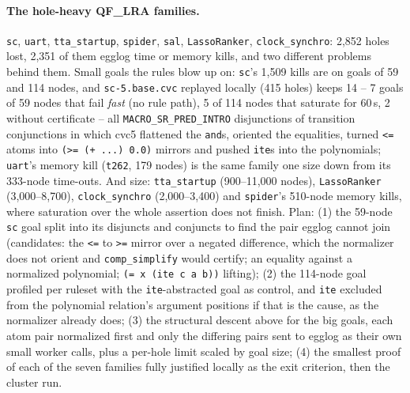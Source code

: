 \documentclass[11pt,a4paper]{article}
\newcommand{\LRA}{QF\_LRA}
\newcommand{\code}[1]{\texttt{#1}}
\begin{document}
\paragraph{The hole-heavy \LRA{} families.} \code{sc}, \code{uart},
\code{tta\_startup}, \code{spider}, \code{sal}, \code{LassoRanker},
\code{clock\_synchro}: 2,852 holes lost, 2,351 of them egglog time or
memory kills, and two different problems behind them. Small goals the
rules blow up on: \code{sc}'s 1,509 kills are on goals of 59 and 114
nodes, and \code{sc-5.base.cvc} replayed locally (415 holes) keeps 14 --
7 goals of 59 nodes that fail \emph{fast} (no rule path), 5 of 114 nodes
that saturate for 60\,s, 2 without certificate -- all
\code{MACRO\_SR\_PRED\_INTRO} disjunctions of transition conjunctions in
which cvc5 flattened the \code{and}s, oriented the equalities, turned
\code{<=} atoms into \code{(>= (+ ...) 0.0)} mirrors and pushed \code{ite}s
into the polynomials; \code{uart}'s memory kill (\code{t262}, 179 nodes) is
the same family one size down from its 333-node time-outs. And size:
\code{tta\_startup} (900--11,000 nodes), \code{LassoRanker} (3,000--8,700),
\code{clock\_synchro} (2,000--3,400) and \code{spider}'s 510-node memory
kills, where saturation over the whole assertion does not finish. Plan:
(1) the 59-node \code{sc} goal split into its disjuncts and conjuncts to
find the pair egglog cannot join (candidates: the \code{<=} to \code{>=}
mirror over a negated difference, which the normalizer does not orient and
\code{comp\_simplify} would certify; an equality against a normalized
polynomial; \code{(= x (ite c a b))} lifting); (2) the 114-node goal
profiled per ruleset with the \code{ite}-abstracted goal as control, and
\code{ite} excluded from the polynomial relation's argument positions if
that is the cause, as the normalizer already does; (3) the structural
descent above for the big goals, each atom pair normalized first and only
the differing pairs sent to egglog as their own small worker calls, plus a
per-hole limit scaled by goal size; (4) the smallest proof of each of the
seven families fully justified locally as the exit criterion, then the
cluster run.
\end{document}
